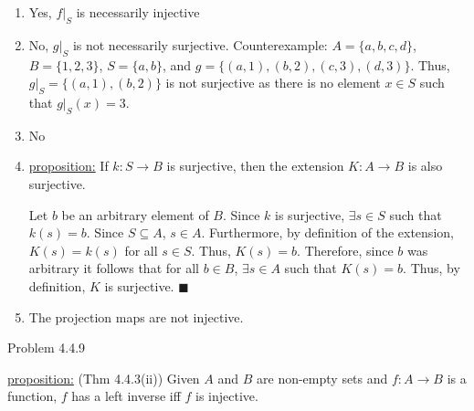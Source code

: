 \documentclass{article}
\theoremstyle{definition}
\begin{document}
	\begin{enumerate}
		\item[3] Yes, $f|_S$ is necessarily injective
		\item[4] No, $g|_S$ is not necessarily surjective. Counterexample:
		$A=\{a,b,c,d\}$, $B=\{1,2,3\}$, $S=\{a,b\}$, and
		$g=\{(a,1),(b,2),(c,3),(d,3)\}$. Thus, $g|_S=\{(a,1),(b,2)\}$ is
		not surjective as there is no element $x\in S$ such that
		$g|_S(x)=3$.
		\item[5] No
		\item[6] \underline{proposition:} If $k:S\rightarrow B$ is
		surjective, then the extension $K:A\rightarrow B$ is also
		surjective.

		\vspace{0.2cm}


		\vspace{0.2cm}

		Let $b$ be an arbitrary element of $B$. Since $k$ is surjective,
		$\exists s\in S$ such that $k(s)=b$. Since $S\subseteq A$, $s\in
		A$. Furthermore, by definition of the extension, $K(s)=k(s)$ for
		all $s\in S$. Thus, $K(s)=b$. Therefore, since $b$ was arbitrary
		it follows that for all $b\in B$, $\exists s\in A$ such that
		$K(s)=b$. Thus, by definition, $K$ is surjective.  $\blacksquare$

		\item[7] The projection maps are not injective.

	\end{enumerate}

	\vspace{1cm}


	\newpage


	\noindent Problem 4.4.9  \vspace{0.3cm}

	\underline{proposition:}  (Thm 4.4.3(ii)) Given $A$ and $B$ are
	non-empty sets and $f:A\rightarrow B$ is a function, $f$ has a left
	inverse iff $f$ is injective.

	\vspace{0.2cm}


	\vspace{0.15cm}
\end{document}
